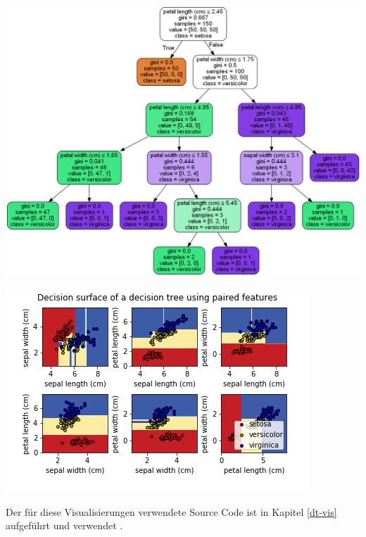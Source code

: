\documentclass[
  12pt, %
  a4paper, %
  oneside, %
  openany, 
  numbers=noenddot, %
  BCOR=5mm, %
  parskip=half*, %
  thesis, %
]{bfhbook}
\begin{document}
\begin{center}
\begin{minipage}[t]{0.45\linewidth}
\centering
	\includegraphics[width=\textwidth]{Bilder/iris-dt-explained.png}
\end{minipage}\hfill
\begin{minipage}[t]{0.45\linewidth}
\centering
	\includegraphics[width=\textwidth]{Bilder/iris-dt-decision-surface.png}
\end{minipage}
\end{center}
Der für diese Visualisierungen verwendete Source Code ist in Kapitel \ref{dt-vis} aufgeführt und verwendet \parencite{scikit-learnLink}.
\end{document}
